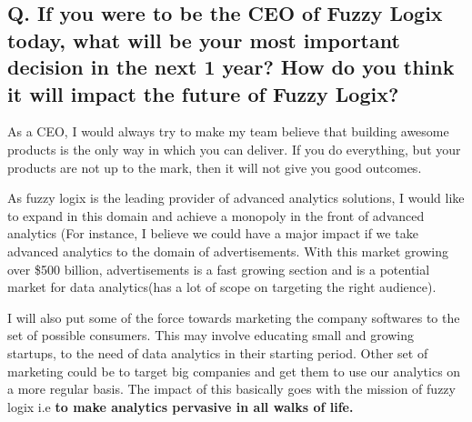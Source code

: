 \documentclass{article}
\begin{document}
\subsection*{Q. If you were to be the CEO of Fuzzy Logix today, what will be your most important decision in the next 1 year? How do you think it will impact the future of Fuzzy Logix?}

As a CEO, I would always try to make my team believe that building awesome products is the only way in which you can deliver. If you do everything, but your products are not up to the mark, then it will not give you good outcomes.

As fuzzy logix is the leading provider of advanced analytics solutions, I would like to expand in this domain and achieve a monopoly in the front of advanced analytics (For instance, I believe we could have a major impact if we take advanced analytics to the domain of advertisements. With this market growing over \$500 billion, advertisements is a fast growing section and is a potential market for data analytics(has a lot of scope on targeting the right audience).

I will also put some of the force towards marketing the company softwares to the set of possible consumers. This may involve educating small and growing startups, to the need of data analytics in their starting period. Other set of marketing could be to target big companies and get them to use our analytics on a more regular basis. The impact of this basically goes with the mission of fuzzy logix i.e \textbf{to make analytics pervasive in all walks of life.}
\end{document}
